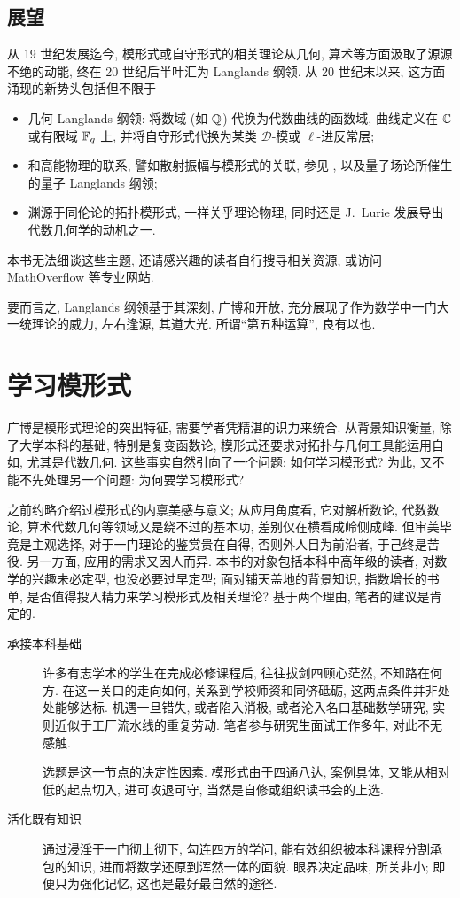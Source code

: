 \subsection*{展望}
从 19 世纪发展迄今, 模形式或自守形式的相关理论从几何, 算术等方面汲取了源源不绝的动能, 终在 20 世纪后半叶汇为 Langlands 纲领. 从 20 世纪末以来, 这方面涌现的新势头包括但不限于
\begin{itemize}
	\item 几何 Langlands 纲领: 将数域 (如 $\mathbb{Q}$) 代换为代数曲线的函数域, 曲线定义在 $\mathbb{C}$ 或有限域 $\mathbb{F}_q$ 上, 并将自守形式代换为某类 $\mathscr{D}$-模或 $\ell$-进反常层;
	\item 和高能物理的联系, 譬如散射振幅与模形式的关联, 参见 \cite{FGHK18}, 以及量子场论所催生的量子 Langlands 纲领;
	\item 渊源于同伦论的拓扑模形式, 一样关乎理论物理, 同时还是 J.\ Lurie 发展导出代数几何学的动机之一.
\end{itemize}
本书无法细谈这些主题, 还请感兴趣的读者自行搜寻相关资源, 或访问 \href{http://mathoverflow.net}{MathOverflow} 等专业网站.

要而言之, Langlands 纲领基于其深刻, 广博和开放, 充分展现了作为数学中一门大一统理论的威力, 左右逢源, 其道大光. 所谓``第五种运算'', 良有以也.

\section*{学习模形式}
广博是模形式理论的突出特征, 需要学者凭精湛的识力来统合. 从背景知识衡量, 除了大学本科的基础, 特别是复变函数论, 模形式还要求对拓扑与几何工具能运用自如, 尤其是代数几何. 这些事实自然引向了一个问题: 如何学习模形式? 为此, 又不能不先处理另一个问题: 为何要学习模形式?

之前约略介绍过模形式的内禀美感与意义; 从应用角度看, 它对解析数论, 代数数论, 算术代数几何等领域又是绕不过的基本功, 差别仅在横看成岭侧成峰. 但审美毕竟是主观选择, 对于一门理论的鉴赏贵在自得, 否则外人目为前沿者, 于己终是苦役. 另一方面, 应用的需求又因人而异. 本书的对象包括本科中高年级的读者, 对数学的兴趣未必定型, 也没必要过早定型; 面对铺天盖地的背景知识, 指数增长的书单, 是否值得投入精力来学习模形式及相关理论? 基于两个理由, 笔者的建议是肯定的.

\begin{description}
	\item[承接本科基础] 许多有志学术的学生在完成必修课程后, 往往拔剑四顾心茫然, 不知路在何方. 在这一关口的走向如何, 关系到学校师资和同侪砥砺, 这两点条件并非处处能够达标. 机遇一旦错失, 或者陷入消极, 或者沦入名曰基础数学研究, 实则近似于工厂流水线的重复劳动. 笔者参与研究生面试工作多年, 对此不无感触.

	选题是这一节点的决定性因素. 模形式由于四通八达, 案例具体, 又能从相对低的起点切入, 进可攻退可守, 当然是自修或组织读书会的上选.

	\item[活化既有知识] 通过浸淫于一门彻上彻下, 勾连四方的学问, 能有效组织被本科课程分割承包的知识, 进而将数学还原到浑然一体的面貌. 眼界决定品味, 所关非小; 即便只为强化记忆, 这也是最好最自然的途径.
\end{description}

